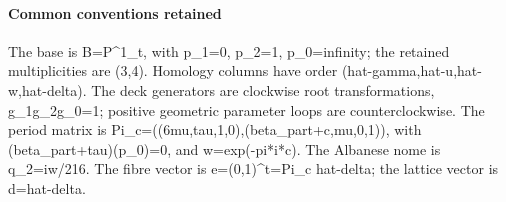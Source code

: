 \paragraph{Common conventions retained}
The base is B=P\textasciicircum{}1\_\allowbreak{}t, with p\_\allowbreak{}1=0, p\_\allowbreak{}2=1, p\_\allowbreak{}0=infinity; the retained multiplicities are (3,4). Homology columns have order (hat-gamma,hat-u,hat-w,hat-delta). The deck generators are clockwise root transformations, g\_\allowbreak{}1g\_\allowbreak{}2g\_\allowbreak{}0=1; positive geometric parameter loops are counterclockwise. The period matrix is Pi\_\allowbreak{}c=((6mu,tau,1,0),(beta\_\allowbreak{}part+c,mu,0,1)), with (beta\_\allowbreak{}part+tau)(p\_\allowbreak{}0)=0, and w=exp(-pi*i*c). The Albanese nome is q\_\allowbreak{}2=iw/\allowbreak{}216. The fibre vector is e=(0,1)\textasciicircum{}t=Pi\_\allowbreak{}c hat-delta; the lattice vector is d=hat-delta.
